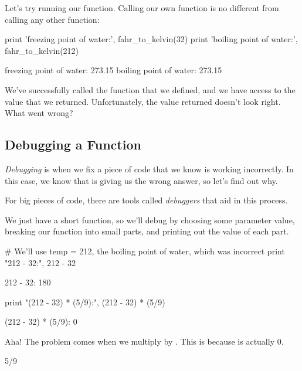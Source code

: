 Let's try running our function. Calling our own function is no different
from calling any other function:

\begin{VerbIn}
print 'freezing point of water:', fahr_to_kelvin(32)
print 'boiling point of water:', fahr_to_kelvin(212)
\end{VerbIn}

\begin{VerbOut}
freezing point of water: 273.15
boiling point of water: 273.15
\end{VerbOut}

We've successfully called the function that we defined, and we have
access to the value that we returned. Unfortunately, the value returned
doesn't look right. What went wrong?

\subsection{Debugging a Function}

\emph{Debugging} is when we fix a piece of code that we know is working
incorrectly. In this case, we know that  is
giving us the wrong answer, so let's find out why.

For big pieces of code, there are tools called \emph{debuggers} that aid
in this process.

We just have a short function, so we'll debug by choosing some parameter
value, breaking our function into small parts, and printing out the
value of each part.

\begin{VerbIn}
# We'll use temp = 212, the boiling point of water, which was incorrect
print "212 - 32:", 212 - 32
\end{VerbIn}

\begin{VerbOut}
212 - 32: 180
\end{VerbOut}

\begin{VerbIn}
print "(212 - 32) * (5/9):", (212 - 32) * (5/9)
\end{VerbIn}

\begin{VerbOut}
(212 - 32) * (5/9): 0
\end{VerbOut}

Aha! The problem comes when we multiply by . This is because
 is actually 0.

\begin{VerbIn}
5/9
\end{VerbIn}

